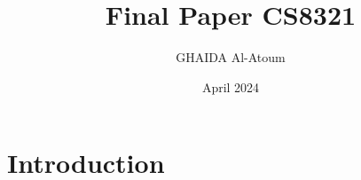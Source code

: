 \documentclass{article}
\title{Final Paper CS8321}
\author{GHAIDA Al-Atoum}
\date{April 2024}
\begin{document}
\maketitle

\section{Introduction}
\end{document}
